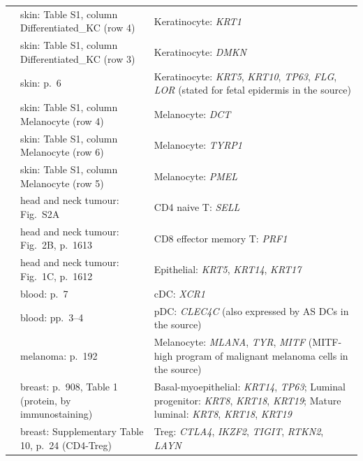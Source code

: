 \begin{longtable}{@{}>{\raggedright\arraybackslash}p{2.0cm} >{\raggedright\arraybackslash}p{4.6cm} >{\raggedright\arraybackslash}p{8.4cm}@{}}
\cite{reynoldsDevelopmentalCellPrograms2021} & skin: Table S1, column Differentiated\_KC (row 4) & Keratinocyte: \textit{KRT1} \\
\cite{reynoldsDevelopmentalCellPrograms2021} & skin: Table S1, column Differentiated\_KC (row 3) & Keratinocyte: \textit{DMKN} \\
\cite{reynoldsDevelopmentalCellPrograms2021} & skin: p.~6 & Keratinocyte: \textit{KRT5}, \textit{KRT10}, \textit{TP63}, \textit{FLG}, \textit{LOR} (stated for fetal epidermis in the source) \\
\cite{reynoldsDevelopmentalCellPrograms2021} & skin: Table S1, column Melanocyte (row 4) & Melanocyte: \textit{DCT} \\
\cite{reynoldsDevelopmentalCellPrograms2021} & skin: Table S1, column Melanocyte (row 6) & Melanocyte: \textit{TYRP1} \\
\cite{reynoldsDevelopmentalCellPrograms2021} & skin: Table S1, column Melanocyte (row 5) & Melanocyte: \textit{PMEL} \\
\cite{puramSingleCellTranscriptomicAnalysis2017} & head and neck tumour: Fig.~S2A & CD4 naive T: \textit{SELL} \\
\cite{puramSingleCellTranscriptomicAnalysis2017} & head and neck tumour: Fig.~2B, p.~1613 & CD8 effector memory T: \textit{PRF1} \\
\cite{puramSingleCellTranscriptomicAnalysis2017} & head and neck tumour: Fig.~1C, p.~1612 & Epithelial: \textit{KRT5}, \textit{KRT14}, \textit{KRT17} \\
\cite{villaniSinglecellRNAseqReveals2017} & blood: p.~7 & cDC: \textit{XCR1} \\
\cite{villaniSinglecellRNAseqReveals2017} & blood: pp.~3--4 & pDC: \textit{CLEC4C} (also expressed by AS DCs in the source) \\
\cite{tiroshDissectingMulticellularEcosystem2016} & melanoma: p.~192 & Melanocyte: \textit{MLANA}, \textit{TYR}, \textit{MITF} (MITF-high program of malignant melanoma cells in the source) \\
\cite{limAberrantLuminalProgenitors2009} & breast: p.~908, Table 1 (protein, by immunostaining) & Basal-myoepithelial: \textit{KRT14}, \textit{TP63}; Luminal progenitor: \textit{KRT8}, \textit{KRT18}, \textit{KRT19}; Mature luminal: \textit{KRT8}, \textit{KRT18}, \textit{KRT19} \\
\cite{kumarSpatiallyResolvedSinglecell2023} & breast: Supplementary Table 10, p.~24 (CD4-Treg) & Treg: \textit{CTLA4}, \textit{IKZF2}, \textit{TIGIT}, \textit{RTKN2}, \textit{LAYN} \\

\end{longtable}
